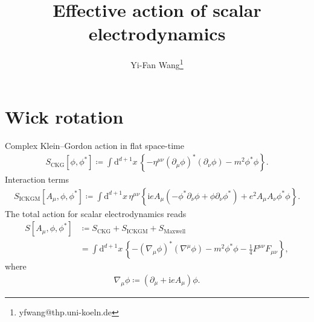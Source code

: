 \documentclass[12pt]{article}
\newcommand\mi{\mathrm{i}} %
\newcommand\dif{\mathrm{d}}
\newcommand{\rbr}[1]{{\left(#1\right)}}
\newcommand{\cbr}[1]{{\left\{#1\right\}}}
\newcommand{\sfun}[2]{{#1}\mathopen{}\left[#2\right]\mathclose{}}
\begin{document}
\title{Effective action of scalar electrodynamics} 


\date{}


\author[3]{Yi-Fan Wang\thanks{yfwang@thp.uni-koeln.de}}





\maketitle

%


\section{Wick rotation}


Complex Klein--Gordon action in flat space-time
\begin{align}
\sfun{S_\text{CKG}}{\phi,\phi^*}\coloneqq\int\dif^{d+1}x\,\cbr{-\eta^{\mu\nu}
\rbr{\partial_\mu\phi}^* \rbr{\partial_\nu\phi} - m^2\phi^*\phi}.
\end{align}
Interaction terms
\begin{align}
\sfun{S_\text{ICKGM}}{A_\mu,\phi,\phi^*} \coloneqq \int\dif^{d+1}x\,
\eta^{\mu\nu}{}
\cbr{\mi e A_\mu \rbr{-\phi^*\partial_\nu\phi+\phi\partial_\nu\phi^*}
+e^2 A_\mu A_\nu \phi^* \phi}.
\end{align}
The total action for scalar electrodynamics reads
\begin{align}
\sfun{S}{A_\mu, \phi, \phi^*} &\coloneqq 
S_\text{CKG} + S_\text{ICKGM} + S_\text{Maxwell} \nonumber \\
&= \int\dif^{d+1}x\,\cbr{-\rbr{\nabla_{\!\mu} \phi}^* \rbr{\nabla^\mu\phi} - 
m^2\phi^*\phi -\frac{1}{4}F^{\mu\nu}F_{\mu\nu}},
\end{align}
where
\begin{align}
\nabla_\mu\phi \coloneqq \rbr{\partial_\mu+\mi e A_\mu}\phi.
\end{align}
\end{document}
